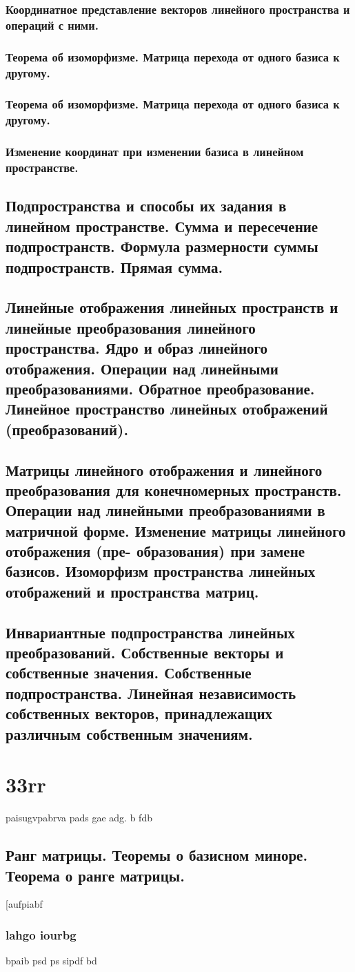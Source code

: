 \documentclass[11pt; a4paper]{report}
\theoremstyle{plain} %
\theoremstyle{defenition}
\theoremstyle{remark}
\begin{document}
\subsection{Координатное представление векторов линейного пространства и операций с ними.}

\subsection{Теорема об изоморфизме. Матрица перехода от одного базиса к другому.}

\subsection{Теорема об изоморфизме. Матрица перехода от одного базиса к другому.}

\subsection{Изменение координат при изменении базиса в линейном пространстве.}




\newpage
\section{Подпространства и способы их задания в линейном пространстве. Сумма и пересечение подпространств. Формула размерности суммы подпространств. Прямая сумма.}
\section{Линейные отображения линейных пространств и линейные преобразования линейного пространства. Ядро и образ линейного отображения. Операции над линейными преобразованиями. Обратное преобразование. Линейное пространство линейных отображений (преобразований).}
\section{Матрицы линейного отображения и линейного преобразования для конечномерных пространств. Операции над линейными преобразованиями в матричной форме. Изменение матрицы линейного отображения (пре- образования) при замене базисов. Изоморфизм пространства линейных отображений и пространства матриц.}
\section{Инвариантные подпространства линейных преобразований. Собственные векторы и собственные значения. Собственные подпространства. Линейная независимость собственных векторов, принадлежащих различным собственным значениям.}


\chapter{33rr}
paisugvpabrva pads gae adg. b fdb
\section{Ранг матрицы. Теоремы о базисном миноре. Теорема о ранге матрицы.}
[aufpiabf
\subsection{lahgo iourbg}
bpaib psd ps sipdf bd
\end{document}
